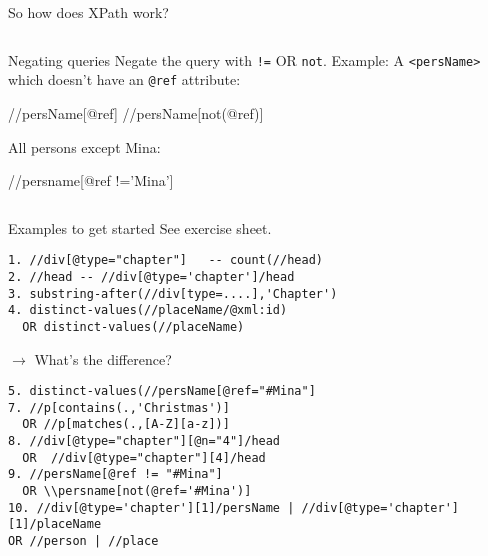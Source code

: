 \begin{frame}{So how does XPath work?}
\begin{columns}
\begin{block}{Negating queries}\footnotesize
Negate the query with \texttt{!=} OR \texttt{not}. Example:
A \texttt{<persName>} which doesn't have an \texttt{@ref} attribute: 
\begin{xmlcode}
//persName[@ref]
//persName[not(@ref)] 
\end{xmlcode}

All persons except Mina:
\begin{xmlcode}
//persname[@ref !='Mina'] 
\end{xmlcode}
\end{block}
\end{columns}

\end{frame}


\begin{frame}[fragile]{Examples to get started}
See exercise sheet. 

\scriptsize
\begin{verbatim}
1. //div[@type="chapter"]   -- count(//head)
2. //head -- //div[@type='chapter']/head
3. substring-after(//div[type=....],'Chapter')
4. distinct-values(//placeName/@xml:id)  
  OR distinct-values(//placeName) 
\end{verbatim}
$\to$ What's the difference?
\begin{verbatim}
5. distinct-values(//persName[@ref="#Mina"]
7. //p[contains(.,'Christmas')]  
  OR //p[matches(.,[A-Z][a-z])]
8. //div[@type="chapter"][@n="4"]/head  
  OR  //div[@type="chapter"][4]/head
9. //persName[@ref != "#Mina"]  
  OR \\persname[not(@ref='#Mina')] 
10. //div[@type='chapter'][1]/persName | //div[@type='chapter'][1]/placeName 
OR //person | //place
\end{verbatim}

\end{frame}

